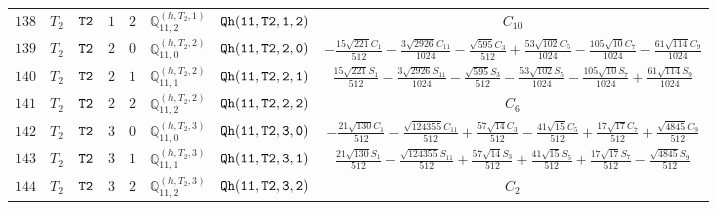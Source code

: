 \documentclass[fleqn,8pt]{jsarticle}
\begin{document}
\begin{table}[ht!]
\begin{center}
\begin{tabular}{cccccccc}
$ 138 $ & $ T_{2} $ & $ {\tt T2} $ & $ 1 $ & $ 2 $ & $ \mathbb{Q}_{11,2}^{(h,T_{2},1)} $ & $ {\tt Qh(11,T2,1,2)} $ & $ C_{10} $ \\
$ 139 $ & $ T_{2} $ & $ {\tt T2} $ & $ 2 $ & $ 0 $ & $ \mathbb{Q}_{11,0}^{(h,T_{2},2)} $ & $ {\tt Qh(11,T2,2,0)} $ & $ - \frac{15 \sqrt{221} C_{1}}{512} - \frac{3 \sqrt{2926} C_{11}}{1024} - \frac{\sqrt{595} C_{3}}{512} + \frac{53 \sqrt{102} C_{5}}{1024} - \frac{105 \sqrt{10} C_{7}}{1024} - \frac{61 \sqrt{114} C_{9}}{1024} $ \\
$ 140 $ & $ T_{2} $ & $ {\tt T2} $ & $ 2 $ & $ 1 $ & $ \mathbb{Q}_{11,1}^{(h,T_{2},2)} $ & $ {\tt Qh(11,T2,2,1)} $ & $ \frac{15 \sqrt{221} S_{1}}{512} - \frac{3 \sqrt{2926} S_{11}}{1024} - \frac{\sqrt{595} S_{3}}{512} - \frac{53 \sqrt{102} S_{5}}{1024} - \frac{105 \sqrt{10} S_{7}}{1024} + \frac{61 \sqrt{114} S_{9}}{1024} $ \\
$ 141 $ & $ T_{2} $ & $ {\tt T2} $ & $ 2 $ & $ 2 $ & $ \mathbb{Q}_{11,2}^{(h,T_{2},2)} $ & $ {\tt Qh(11,T2,2,2)} $ & $ C_{6} $ \\
$ 142 $ & $ T_{2} $ & $ {\tt T2} $ & $ 3 $ & $ 0 $ & $ \mathbb{Q}_{11,0}^{(h,T_{2},3)} $ & $ {\tt Qh(11,T2,3,0)} $ & $ - \frac{21 \sqrt{130} C_{1}}{512} - \frac{\sqrt{124355} C_{11}}{512} + \frac{57 \sqrt{14} C_{3}}{512} - \frac{41 \sqrt{15} C_{5}}{512} + \frac{17 \sqrt{17} C_{7}}{512} + \frac{\sqrt{4845} C_{9}}{512} $ \\
$ 143 $ & $ T_{2} $ & $ {\tt T2} $ & $ 3 $ & $ 1 $ & $ \mathbb{Q}_{11,1}^{(h,T_{2},3)} $ & $ {\tt Qh(11,T2,3,1)} $ & $ \frac{21 \sqrt{130} S_{1}}{512} - \frac{\sqrt{124355} S_{11}}{512} + \frac{57 \sqrt{14} S_{3}}{512} + \frac{41 \sqrt{15} S_{5}}{512} + \frac{17 \sqrt{17} S_{7}}{512} - \frac{\sqrt{4845} S_{9}}{512} $ \\
$ 144 $ & $ T_{2} $ & $ {\tt T2} $ & $ 3 $ & $ 2 $ & $ \mathbb{Q}_{11,2}^{(h,T_{2},3)} $ & $ {\tt Qh(11,T2,3,2)} $ & $ C_{2} $ \\
 \hline \hline
\end{tabular}
\end{center}
\end{table}
\end{document}
